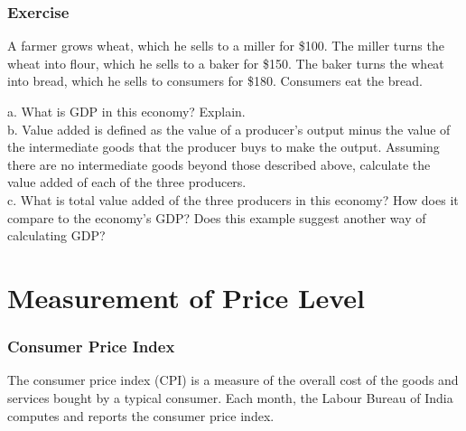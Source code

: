 \documentclass[shownotes,11pt, aspectratio=169]{beamer}
\begin{document}
\begin{frame}
\frametitle{Exercise}
A farmer grows wheat, which he sells to a miller
for \$100. The miller turns the wheat into flour,
which he sells to a baker for \$150. The baker
turns the wheat into bread, which he sells to
consumers for \$180. Consumers eat the bread. \\


\vspace{3mm}

a. What is GDP in this economy? Explain. \\
b. Value added is defined as the value of a
producer's output minus the value of the
intermediate goods that the producer buys
to make the output. Assuming there are no
intermediate goods beyond those described
above, calculate the value added of each of
the three producers. \\
c. What is total value added of the three
producers in this economy? How does it
compare to the economy's GDP? Does this
example suggest another way of calculating
GDP?
\end{frame}

\section{Measurement of Price Level}
\begin{frame}
\frametitle{Consumer Price Index}
The consumer price index (CPI) is a measure of the overall cost of the goods and
services bought by a typical consumer. Each month, the Labour Bureau of India computes and reports the
consumer price index.
\end{frame}
\end{document}
